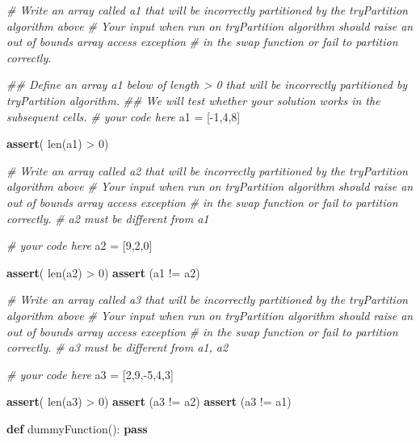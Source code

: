 \documentclass[
]{article}
\newenvironment{Shaded}{}{}
\newcommand{\BuiltInTok}[1]{\textcolor[rgb]{0.00,0.50,0.00}{#1}}
\newcommand{\CommentTok}[1]{\textcolor[rgb]{0.38,0.63,0.69}{\textit{#1}}}
\newcommand{\ControlFlowTok}[1]{\textcolor[rgb]{0.00,0.44,0.13}{\textbf{#1}}}
\newcommand{\DecValTok}[1]{\textcolor[rgb]{0.25,0.63,0.44}{#1}}
\newcommand{\KeywordTok}[1]{\textcolor[rgb]{0.00,0.44,0.13}{\textbf{#1}}}
\newcommand{\NormalTok}[1]{#1}
\newcommand{\OperatorTok}[1]{\textcolor[rgb]{0.40,0.40,0.40}{#1}}
\begin{document}
\begin{Shaded}
\begin{Highlighting}[]
\CommentTok{\# Write an array called a1 that will be incorrectly partitioned by the tryPartition algorithm above}
\CommentTok{\# Your input when run on tryPartition algorithm should raise an out of bounds array access exception}
\CommentTok{\# in the swap function or fail to partition correctly.}

\CommentTok{\#\# Define an array a1 below of length \textgreater{} 0 that will be incorrectly partitioned by tryPartition algorithm.}
\CommentTok{\#\# We will test whether your solution works in the subsequent cells.}
\CommentTok{\# your code here}
\NormalTok{a1 }\OperatorTok{=}\NormalTok{ [}\OperatorTok{{-}}\DecValTok{1}\NormalTok{,}\DecValTok{4}\NormalTok{,}\DecValTok{8}\NormalTok{]}

\ControlFlowTok{assert}\NormalTok{( }\BuiltInTok{len}\NormalTok{(a1) }\OperatorTok{\textgreater{}} \DecValTok{0}\NormalTok{)}

\CommentTok{\# Write an array called a2 that will be incorrectly partitioned by the tryPartition algorithm above}
\CommentTok{\# Your input when run on tryPartition algorithm should raise an out of bounds array access exception}
\CommentTok{\# in the swap function or fail to partition correctly.}
\CommentTok{\# a2 must be different from a1}

\CommentTok{\# your code here}
\NormalTok{a2 }\OperatorTok{=}\NormalTok{ [}\DecValTok{9}\NormalTok{,}\DecValTok{2}\NormalTok{,}\DecValTok{0}\NormalTok{]}

\ControlFlowTok{assert}\NormalTok{( }\BuiltInTok{len}\NormalTok{(a2) }\OperatorTok{\textgreater{}} \DecValTok{0}\NormalTok{)}
\ControlFlowTok{assert}\NormalTok{ (a1 }\OperatorTok{!=}\NormalTok{ a2)}


\CommentTok{\# Write an array called a3 that will be incorrectly partitioned by the tryPartition algorithm above}
\CommentTok{\# Your input when run on tryPartition algorithm should raise an out of bounds array access exception}
\CommentTok{\# in the swap function or fail to partition correctly.}
\CommentTok{\# a3 must be different from a1, a2}

\CommentTok{\# your code here}
\NormalTok{a3 }\OperatorTok{=}\NormalTok{ [}\DecValTok{2}\NormalTok{,}\DecValTok{9}\NormalTok{,}\OperatorTok{{-}}\DecValTok{5}\NormalTok{,}\DecValTok{4}\NormalTok{,}\DecValTok{3}\NormalTok{]}

\ControlFlowTok{assert}\NormalTok{( }\BuiltInTok{len}\NormalTok{(a3) }\OperatorTok{\textgreater{}} \DecValTok{0}\NormalTok{)}
\ControlFlowTok{assert}\NormalTok{ (a3 }\OperatorTok{!=}\NormalTok{ a2)}
\ControlFlowTok{assert}\NormalTok{ (a3 }\OperatorTok{!=}\NormalTok{ a1)}

\KeywordTok{def}\NormalTok{ dummyFunction():}
    \ControlFlowTok{pass}
\end{Highlighting}
\end{Shaded}
\end{document}
